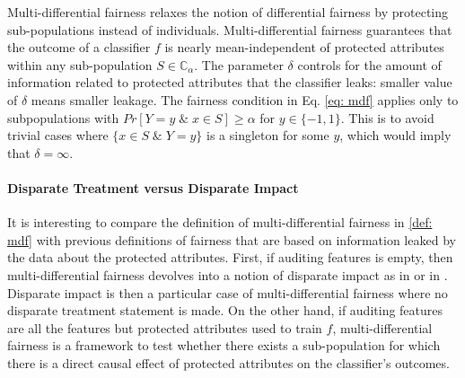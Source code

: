\documentclass{article}
\begin{document}
Multi-differential fairness relaxes the notion of differential fairness by protecting sub-populations instead of individuals. Multi-differential fairness guarantees that the outcome of a classifier $f$ is nearly mean-independent of protected attributes within any sub-population $S\in \mathbb{C}_{\alpha}$. The parameter $\delta$ controls for the amount of information related to protected attributes that the classifier leaks: smaller value of $\delta$ means smaller leakage. The fairness condition in Eq. \ref{eq: mdf} applies only to subpopulations with $Pr[Y=y \;\&\; x\in S] \geq \alpha$ for $y\in\{-1, 1\}$. This is to avoid trivial cases where $\{x\in S \; \& \; Y=y\}$ is a singleton for some $y$, which would imply that $\delta=\infty$. 

\paragraph{Disparate Treatment versus Disparate Impact}
It is interesting to compare the definition of multi-differential fairness in \ref{def: mdf} with previous definitions of fairness that are based on information leaked by the data about the protected attributes.  First, if auditing features is empty, then multi-differential fairness devolves into a notion of disparate impact as in \cite{feldman2015certifying} or in \cite{chouldechova2017fair}. Disparate impact is then a particular case of multi-differential fairness where no disparate treatment  statement is made. On the other hand, if auditing features are all the features but protected attributes used to train $f$, multi-differential fairness is a framework to test whether there exists a sub-population for which there is a direct causal effect of protected attributes on the classifier's outcomes. 
\end{document}
